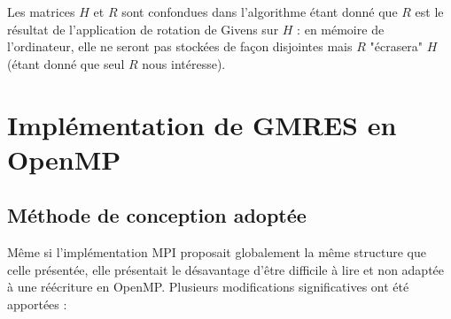 \documentclass[11pt,a4paper,oneside]{memoir}
\theoremstyle{definition}
\theoremstyle{remark}
\theoremstyle{plain}
\begin{document}
Les matrices $H$ et $R$ sont confondues dans l'algorithme étant donné que $R$ est le résultat de l'application de rotation de Givens sur $H$ : en mémoire de l'ordinateur, elle ne seront pas stockées de façon disjointes mais $R$ "écrasera" $H$ (étant donné que seul $R$ nous intéresse).



\section{Implémentation de GMRES en OpenMP}

\subsection{Méthode de conception adoptée}

Même si l'implémentation MPI proposait globalement la même structure que celle présentée, elle présentait le désavantage d'être difficile à lire et non adaptée à une réécriture en OpenMP. Plusieurs modifications significatives ont été apportées :
\end{document}
